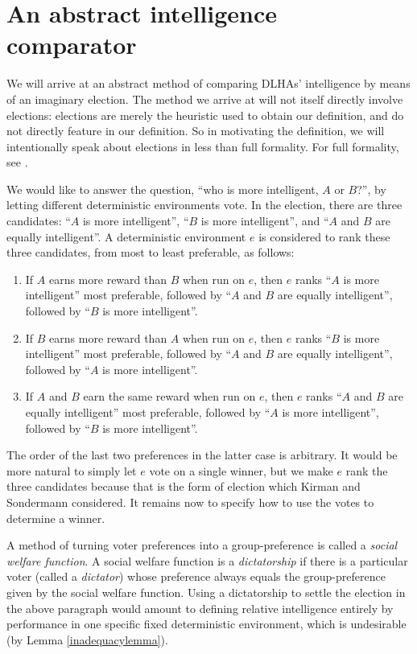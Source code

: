 \documentclass[twoside,11pt]{article}
\begin{document}
\section{An abstract intelligence comparator}
\label{maindefinitionsection}

We will arrive at an abstract method of comparing DLHAs' intelligence by means of
an imaginary election. The method we arrive at will not itself directly involve elections:
elections are merely the heuristic used to obtain our definition, and do not directly
feature in our definition.
So in motivating the definition, we will intentionally
speak about elections in less than full formality. For full formality, see \citet{kirman}.

We would like to answer the question,
``who is more intelligent, $A$ or $B$?'', by letting different
deterministic environments vote. In the election, there are three
candidates: ``$A$ is more intelligent'',
``$B$ is more intelligent'', and ``$A$ and $B$ are equally intelligent''.
A deterministic environment $e$ is considered to rank these three candidates,
from most to least
preferable, as follows:
\begin{enumerate}
    \item
    If $A$ earns more reward than $B$ when run on $e$,
    then $e$ ranks ``$A$ is more intelligent'' most preferable,
    followed by ``$A$ and $B$ are equally intelligent'', followed
    by ``$B$ is more intelligent''.
    \item
    If $B$ earns more reward than $A$ when run on $e$,
    then $e$ ranks ``$B$ is more intelligent'' most preferable,
    followed by ``$A$ and $B$ are equally intelligent'', followed
    by ``$A$ is more intelligent''.
    \item
    If $A$ and $B$ earn the same reward when run on $e$,
    then $e$ ranks ``$A$ and $B$ are equally intelligent'' most preferable,
    followed by ``$A$ is more intelligent'',
    followed by ``$B$ is more intelligent''.
\end{enumerate}
The order of the last two preferences in the latter case is arbitrary.
It would be more natural to simply let $e$ vote on a single winner,
but we make $e$ rank the three candidates because that is the form
of election which
Kirman and Sondermann
considered.
It remains now to specify how to use the votes to determine a winner.

A method of turning voter preferences into a group-preference is
called a \emph{social welfare function}.
A social welfare function is a \emph{dictatorship} if there is a particular voter
(called a \emph{dictator}) whose preference
always equals the group-preference given by the social welfare function.
Using a dictatorship to settle the election in
the above paragraph would amount to defining relative intelligence entirely by performance
in one specific fixed deterministic environment,
which is undesirable (by Lemma \ref{inadequacylemma}).
\end{document}
